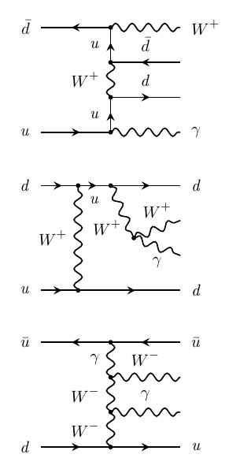 \begin{figure}[t]
\centering
\begin{subfigure}[b]{0.32\textwidth}
    \centering
    \includegraphics[width=\textwidth]{plots/diffx/vbswgEW1.pdf}
    \caption{}
\end{subfigure}
\hfill
\begin{subfigure}[b]{0.32\textwidth}
    \centering
    \includegraphics[width=\textwidth]{plots/diffx/vbswgEW2.pdf}
    \caption{}
\end{subfigure}
\hfill
\begin{subfigure}[b]{0.32\textwidth}
    \centering
    \includegraphics[width=\textwidth]{plots/diffx/vbswgEW4-1.pdf}

\end{subfigure}
\end{figure}
